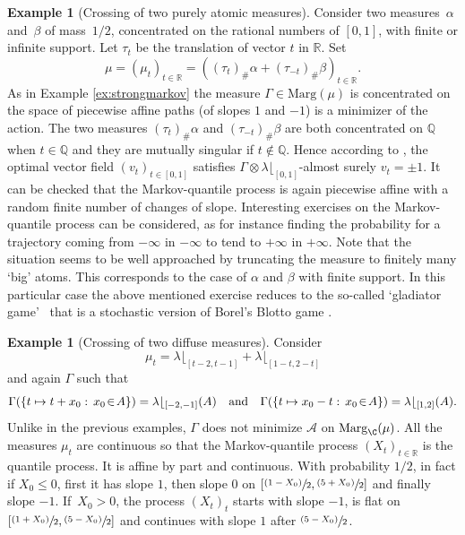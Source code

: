 \documentclass[JEP,XML,SOM,Unicode,NoEqCountersInSection,NoFloatCountersInSection,published]{cedram}
\newcommand\mto{\mathchoice{\longmapsto}{\mapsto}{\mapsto}{\mapsto}}
\newcommand{\psfrac}[2]{\sfrac{(#1)}{#2}}
\theoremstyle{plain}
\theoremstyle{definition}
\newtheorem{ex}[them]{Example}
\newcommand{\A}{{\mathcal A}}
\newcommand{\la}{\lambda}
\newcommand{\ma}{\mathrm{Marg}}
\newcommand{\R}{\mathbb{R}}
\newcommand{\Q}{\mathbb{Q}}
\newcommand{\AND}{\quad\text{and}\quad}
\begin{document}
\begin{ex}[Crossing of two purely atomic measures]\label{ex:rationnal}
Consider two measures~$\alpha$ and~$\beta$ of mass~$1/2$, concentrated on the rational numbers of $[0,1]$, with finite or infinite support. Let $\tau_t$ be the translation of vector $t$ in $\R$. Set
\[
\mu=(\mu_t)_{t\in\R}=((\tau_t)_\#\alpha+(\tau_{-t})_\#\beta)_{t\in\R}.
\]
As in Example \ref{ex:strongmarkov} the measure $\Gamma\in \ma(\mu)$ is concentrated on the space of piecewise affine paths (of slopes $1$ and $-1$) is a minimizer of the action. The two measures $(\tau_t)_\#\alpha$ and $(\tau_{-t})_\#\beta$ are both concentrated on $\Q$ when $t\in \Q$ and they are mutually singular if $t\notin \Q$. Hence according to \cite{BouJui2}, the optimal vector field $(v_t)_{t\in [0,1]}$ satisfies $\Gamma\otimes \lambda\lfloor_{[0,1]}$-almost surely $v_t=\pm 1$. It can be checked that the Markov-quantile process is again piecewise affine with a random finite number of changes of slope. Interesting exercises on the Markov-quantile process can be considered, as for instance finding the probability for a trajectory coming from $-\infty$ in $-\infty$ to tend to $+\infty$ in $+\infty$. Note that the situation seems to be well approached by truncating the measure to finitely many `big' atoms. This corresponds to the case of $\alpha$ and $\beta$ with finite support. In this particular case the above mentioned exercise reduces to the so-called `gladiator game'~\cite{KLN} that is a stochastic version of Borel's Blotto game \cite{RSY}.
\end{ex}

\begin{ex}[Crossing of two diffuse measures]\label{ex:continuous}Consider
\[
\mu_t=\la\lfloor_{[t-2,t-1]}+\la\lfloor_{[1-t,2-t]}
\]
and again $\Gamma$ such that
\[\textstyle
\Gamma(\{t\mto t+x_0:\,x_0\!\in\!A\})=\la\lfloor_{[-2,-1]}(A)\AND \Gamma(\{t\mto x_0-t:\,x_0\!\in\! A\})=\la\lfloor_{[1,2]}(A).
\]
Unlike in the previous examples, $\Gamma$ does not minimize $\A$ on $\ma_\C(\mu)$. All the measures $\mu_t$ are continuous so that the Markov-quantile process $(X_t)_{t\in \R}$ is the quantile process. It is affine by part and continuous. With probability $1/2$, in fact if $X_0\leq 0$, first it has slope $1$, then slope $0$ on $[\psfrac{1-X_0}{2},\psfrac{5+X_0}{2}]$ and finally slope $-1$. If~$X_0>0$, the process $(X_t)_{t}$ starts with slope $-1$, is flat on $[\psfrac{1+X_0}{2},\psfrac{5-X_0}{2}]$ and continues with slope $1$ after $\psfrac{5-X_0}{2}$.
\end{ex}
\end{document}
